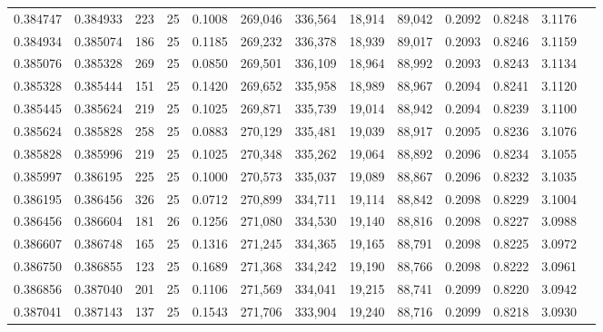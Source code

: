\begin{tabular}{rrrrrrrrrrrrr}
0.384747 & 0.384933 &   223 &  25 &                                     0.1008 & 269,046 & 336,564 &  18,914 &  89,042 & 0.2092 & 0.8248 & 3.1176 \\
0.384934 & 0.385074 &   186 &  25 &                                     0.1185 & 269,232 & 336,378 &  18,939 &  89,017 & 0.2093 & 0.8246 & 3.1159 \\
0.385076 & 0.385328 &   269 &  25 &                                     0.0850 & 269,501 & 336,109 &  18,964 &  88,992 & 0.2093 & 0.8243 & 3.1134 \\
0.385328 & 0.385444 &   151 &  25 &                                     0.1420 & 269,652 & 335,958 &  18,989 &  88,967 & 0.2094 & 0.8241 & 3.1120 \\
0.385445 & 0.385624 &   219 &  25 &                                     0.1025 & 269,871 & 335,739 &  19,014 &  88,942 & 0.2094 & 0.8239 & 3.1100 \\
0.385624 & 0.385828 &   258 &  25 &                                     0.0883 & 270,129 & 335,481 &  19,039 &  88,917 & 0.2095 & 0.8236 & 3.1076 \\
0.385828 & 0.385996 &   219 &  25 &                                     0.1025 & 270,348 & 335,262 &  19,064 &  88,892 & 0.2096 & 0.8234 & 3.1055 \\
0.385997 & 0.386195 &   225 &  25 &                                     0.1000 & 270,573 & 335,037 &  19,089 &  88,867 & 0.2096 & 0.8232 & 3.1035 \\
0.386195 & 0.386456 &   326 &  25 &                                     0.0712 & 270,899 & 334,711 &  19,114 &  88,842 & 0.2098 & 0.8229 & 3.1004 \\
0.386456 & 0.386604 &   181 &  26 &                                     0.1256 & 271,080 & 334,530 &  19,140 &  88,816 & 0.2098 & 0.8227 & 3.0988 \\
0.386607 & 0.386748 &   165 &  25 &                                     0.1316 & 271,245 & 334,365 &  19,165 &  88,791 & 0.2098 & 0.8225 & 3.0972 \\
0.386750 & 0.386855 &   123 &  25 &                                     0.1689 & 271,368 & 334,242 &  19,190 &  88,766 & 0.2098 & 0.8222 & 3.0961 \\
0.386856 & 0.387040 &   201 &  25 &                                     0.1106 & 271,569 & 334,041 &  19,215 &  88,741 & 0.2099 & 0.8220 & 3.0942 \\
0.387041 & 0.387143 &   137 &  25 &                                     0.1543 & 271,706 & 333,904 &  19,240 &  88,716 & 0.2099 & 0.8218 & 3.0930 \\

\end{tabular}
